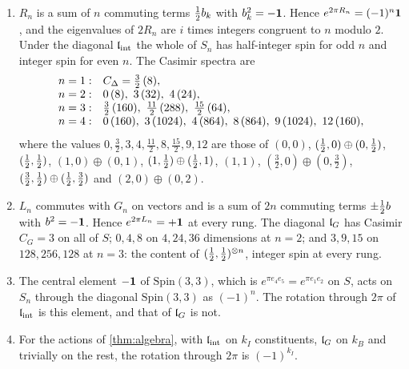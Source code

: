 \begin{proposition}
\label{e3:prop:spin}
\begin{enumerate}[label=(\roman*),leftmargin=2.2em]
\item $R_n$ is a sum of $n$ commuting terms $\tfrac12 b_k$ with $b_k^2=-\mathbf 1$. Hence $e^{2\pi R_n}=(-1)^n\mathbf 1$, and the eigenvalues of $2R_n$ are $i$ times
integers congruent to $n$ modulo $2$. Under the diagonal $\mathfrak l_{\rm int}$ the whole of $S_n$ has half-integer spin for odd $n$ and integer spin for even
$n$. The Casimir spectra are
\[
\begin{array}{@{}ll@{}}
n=1: & C_\Delta=\tfrac32\,(8),\\
n=2: & 0\,(8),\ 3\,(32),\ 4\,(24),\\
n=3: & \tfrac32\,(160),\ \tfrac{11}2\,(288),\ \tfrac{15}2\,(64),\\
n=4: & 0\,(160),\ 3\,(1024),\ 4\,(864),\ 8\,(864),\ 9\,(1024),\ 12\,(160),
\end{array}
\]
where the values $0,\tfrac32,3,4,\tfrac{11}2,8,\tfrac{15}2,9,12$ are those of $(0,0)$, $(\tfrac12,0)\oplus(0,\tfrac12)$, $(\tfrac12,\tfrac12)$, $(1,0)\oplus(0,1)$, $(1,\tfrac12)\oplus(\tfrac12,1)$, $(1,1)$, $(\tfrac32,0)\oplus(0,\tfrac32)$,
$(\tfrac32,\tfrac12)\oplus(\tfrac12,\tfrac32)$ and $(2,0)\oplus(0,2)$.
\item $L_n$ commutes with $G_n$ on vectors and is a sum of $2n$ commuting terms $\pm\tfrac12 b$ with $b^2=-\mathbf 1$. Hence $e^{2\pi L_n}=+\mathbf 1$ at every rung. The
diagonal $\mathfrak l_G$ has Casimir $C_G=3$ on all of $S$; $0,4,8$ on $4,24,36$ dimensions at $n=2$; and $3,9,15$ on $128,256,128$ at $n=3$: the content of
$(\tfrac12,\tfrac12)^{\otimes n}$, integer spin at every rung.
\item The central element $-\mathbf 1$ of $\mathrm{Spin}(3,3)$, which is $e^{\pi e_4e_5}=e^{\pi e_1e_2}$ on $S$, acts on $S_n$ through the diagonal
$\mathrm{Spin}(3,3)$ as $(-1)^n$. The rotation through $2\pi$ of $\mathfrak l_{\rm int}$ is this element, and that of $\mathfrak l_G$ is not.
\item For the actions of \cref{thm:algebra}, with $\mathfrak l_{\rm int}$ on $k_I$ constituents, $\mathfrak l_G$ on $k_B$ and trivially on the rest, the rotation
through $2\pi$ is $(-1)^{k_I}$.
\end{enumerate}
\end{proposition}

